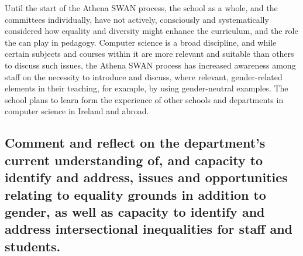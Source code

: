 Until the start of the Athena SWAN process, the school as a whole, and the committees individually, have not actively, consciously and systematically considered how equality and diversity might enhance the curriculum, and the role the can play in pedagogy. Computer science is a broad discipline, and while certain subjects and courses within it are more relevant and suitable than others to discuss such issues, the Athena SWAN process has increased awareness among staff on the necessity to introduce and discuss, where relevant, gender-related elements in their teaching, for example, by using gender-neutral examples. The school plans to learn form the experience of other schools and departments in computer science in Ireland and abroad.


\subsection{Comment and reflect on the department’s current understanding of, and capacity to identify and address, issues and opportunities relating to equality grounds in addition to gender, as well as capacity to identify and address intersectional inequalities for staff and students.}


